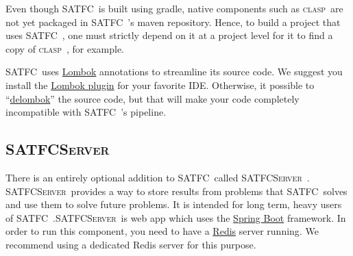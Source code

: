 \documentclass[
10pt, %
letterpaper, %
oneside, %
headinclude,footinclude, %
BCOR5mm, %
needspace, %
]{scrartcl}
\newcommand{\SATFC}{\textsc{SATFC}~}
\newcommand{\SATFCServer}{\textsc{SATFCServer}~}
\newcommand{\clasp}{\textsc{clasp}~}
\begin{document}
Even though \SATFC is built using gradle, native components such as \clasp are not yet packaged in \SATFC's maven repository. Hence, to build a project that uses \SATFC, one must strictly depend on it at a project level for it to find a copy of \clasp, for example. 

\SATFC uses \href{http://projectlombok.org/}{Lombok} annotations to streamline its source code. We suggest you install the \href{http://projectlombok.org/download.html}{Lombok plugin} for your favorite IDE. Otherwise, it possible to ``\href{http://projectlombok.org/features/delombok.html}{delombok}'' the source code, but that will make your code completely incompatible with \SATFC's pipeline.


%



\subsection{\SATFCServer}

There is an entirely optional addition to \SATFC called \SATFCServer. \SATFCServer provides a way to store results from problems that \SATFC solves and use them to solve future problems. It is intended for long term, heavy users of \SATFC.\SATFCServer is web app which uses the \href{http://projects.spring.io/spring-boot/}{Spring Boot} framework. In order to run this component, you need to have a \href{http://redis.io/}{Redis} server running. We recommend using a dedicated Redis server for this purpose.
\end{document}
